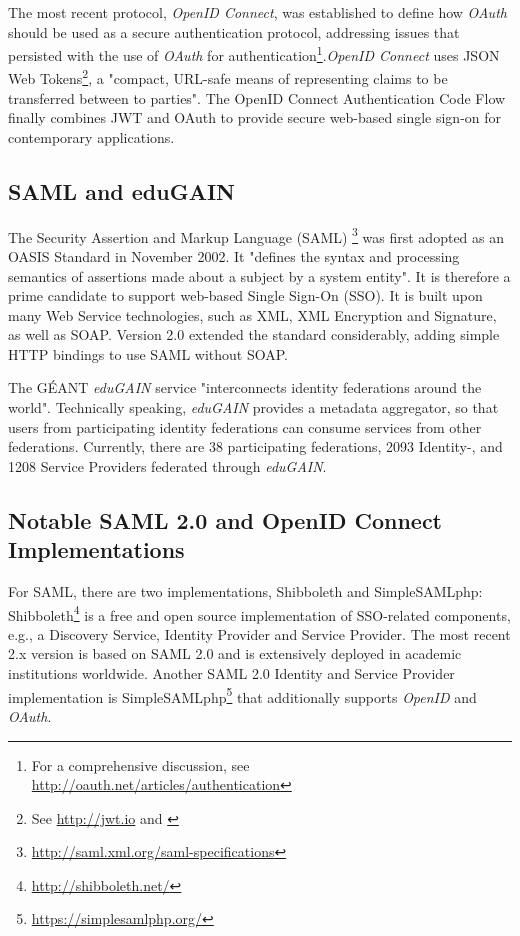 \documentclass{llncs}
\begin{document}
The most recent protocol, \textit{OpenID Connect}, was established to define how \textit{OAuth} should be used as a secure authentication protocol, addressing issues that persisted with the use of \textit{OAuth} for authentication\footnote{For a comprehensive discussion, see \url{http://oauth.net/articles/authentication}}.\textit{OpenID Connect} uses JSON Web Tokens\footnote{See \url{http://jwt.io} and \cite{RFC7519}}, a "compact, URL-safe means of representing claims to be transferred between to parties". The OpenID Connect Authentication Code Flow finally combines JWT and OAuth to provide secure web-based single sign-on for contemporary applications.

\subsection{SAML and eduGAIN}

The Security Assertion and Markup Language (SAML) \footnote{\url{http://saml.xml.org/saml-specifications}} was first adopted as an OASIS Standard in November 2002. It "defines the syntax and processing semantics of assertions made about a subject by a system entity". It is therefore a prime candidate to support web-based Single Sign-On (SSO). It is built upon many Web Service technologies, such as XML, XML Encryption and Signature, as well as SOAP. Version 2.0 extended the standard considerably, adding simple HTTP bindings to use SAML without SOAP.

The GÉANT \textit{eduGAIN} service "interconnects identity federations around the world". Technically speaking, \textit{eduGAIN} provides a metadata aggregator, so that users from participating identity federations can consume services from other federations. Currently, there are 38 participating federations, 2093 Identity-, and 1208 Service Providers federated through \textit{eduGAIN}.

\subsection{Notable SAML 2.0 and OpenID Connect Implementations}

For SAML, there are two implementations, Shibboleth and SimpleSAMLphp: Shibboleth\footnote{\url{http://shibboleth.net/}} is a free and open source implementation of SSO-related components, e.g., a Discovery Service, Identity Provider and Service Provider. The most recent 2.x version is based on SAML 2.0 and is extensively deployed in academic institutions worldwide. Another SAML 2.0 Identity and Service Provider implementation is SimpleSAMLphp\footnote{\url{https://simplesamlphp.org/}} that additionally supports \textit{OpenID} and \textit{OAuth}. 
\end{document}
